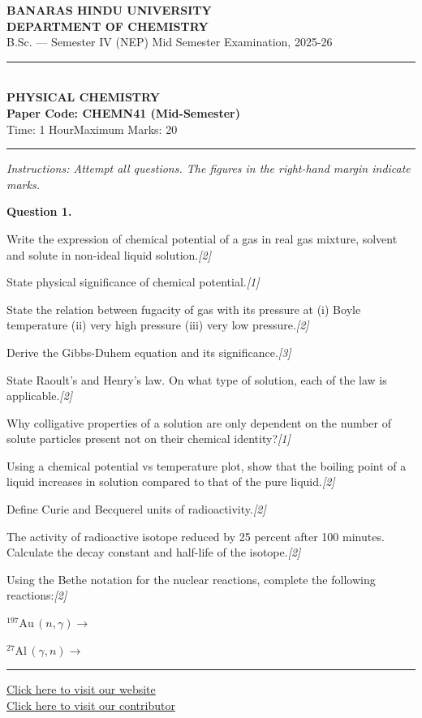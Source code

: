 \documentclass[11pt,a4paper]{article}
\newcommand{\pts}[1]{\hfill   \textit{[#1]}}
\begin{document}
\begin{center}
  {\large\bfseries BANARAS HINDU UNIVERSITY}\\[2pt]
  {\large\bfseries DEPARTMENT OF CHEMISTRY}\\[2pt]
  {\normalsize B.Sc. --- Semester IV (NEP) Mid Semester Examination, 2025-26}\\[6pt]
  \rule{0.8\linewidth}{0.5pt}\\[6pt]
  {\large\bfseries PHYSICAL CHEMISTRY}\\[4pt]
  {\large\bfseries Paper Code: CHEMN41 (Mid-Semester)}\\[4pt]
  {\normalsize Time: 1 Hour\hfill Maximum Marks: 20}
\end{center}

\rule{\linewidth}{0.4pt}

\smallskip



\noindent   \textit{Instructions: Attempt all questions. The figures in the right-hand margin indicate marks.}

\bigskip




\noindent   \textbf{Question 1.}

\begin{parts}
  \item Write the expression of chemical potential of a gas in real gas mixture, solvent and solute in non-ideal liquid solution.\pts{2}
  \item State physical significance of chemical potential.\pts{1}
  \item State the relation between fugacity of gas with its pressure at (i) Boyle temperature (ii) very high pressure (iii) very low pressure.\pts{2}
  \item Derive the Gibbs-Duhem equation and its significance.\pts{3}
  \item State Raoult's and Henry's law. On what type of solution, each of the law is applicable.\pts{2}
  \item Why colligative properties of a solution are only dependent on the number of solute particles present not on their chemical identity?\pts{1}
  \item Using a chemical potential vs temperature plot, show that the boiling point of a liquid increases in solution compared to that of the pure liquid.\pts{2}
  \item Define Curie and Becquerel units of radioactivity.\pts{2}
  \item The activity of radioactive isotope reduced by 25 percent after 100 minutes. Calculate the decay constant and half-life of the isotope.\pts{2}
  \item Using the Bethe notation for the nuclear reactions, complete the following reactions:\pts{2}
  
\begin{parts}
    \item ${}^{197}\mathrm{Au}\,(n, \gamma) \longrightarrow$
    \item ${}^{27}\mathrm{Al}\,(\gamma, n) \longrightarrow$
  \end{parts}
\end{parts}

\vfill
\rule{\linewidth}{0.4pt}

\begin{center}\small
\href{https://bhu-exam.vercel.app/}{Click here to visit our website}\\[4pt]
\href{https://me-aryan.vercel.app/}{Click here to visit our contributor}
\end{center}
\end{document}
